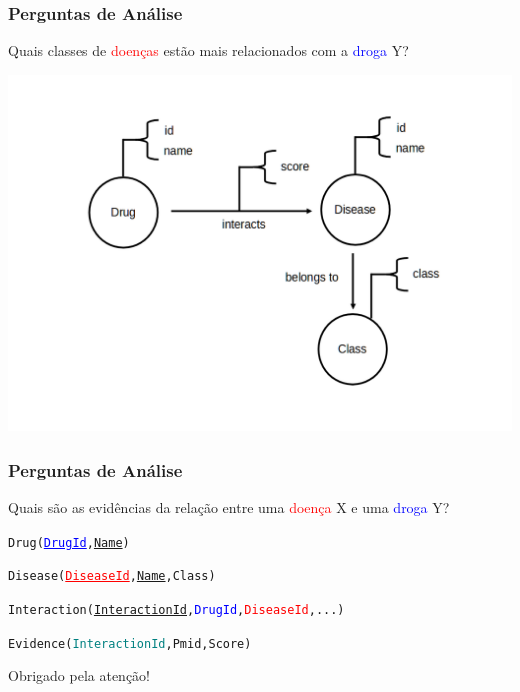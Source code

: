 \documentclass[12pt]{beamer}
\begin{document}
\begin{frame}
  \frametitle{Perguntas de Análise}

  Quais classes de \textcolor{red}{doenças} estão mais relacionados com a \textcolor{blue}{droga} Y? 
  \pause
  
  \centering
  \includegraphics[scale=0.2]{logicografo.png}
\end{frame}

\begin{frame}
  \frametitle{Perguntas de Análise}

  Quais são as evidências da relação entre uma \textcolor{red}{doença} X e uma \textcolor{blue}{droga} Y?
  \pause

  \begin{alltt}\small
    Drug(\textcolor{blue}{\underline{DrugId}}, \underline{Name})
    
    Disease(\textcolor{red}{\underline{DiseaseId}}, \underline{Name}, Class)

    Interaction(\underline{InteractionId}, \textcolor{blue}{DrugId}, \textcolor{red}{DiseaseId}, ...)
               
    Evidence(\textcolor{teal}{InteractionId}, Pmid, Score)
                  
  \end{alltt}
\end{frame}

\begin{frame}
  \centering Obrigado pela atenção!
\end{frame}
\end{document}
